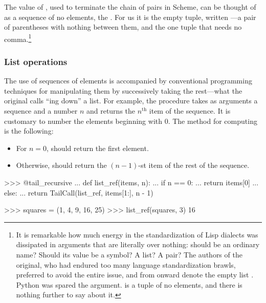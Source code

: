 The value of , used to terminate the chain of pairs in Scheme, can be
thought
of as a sequence of no elements, the .  For us it is the
empty tuple, written \code{()}---a pair of parentheses with nothing between
them, and the one tuple that needs no comma.\footnote{It is remarkable how much
energy in the standardization of Lisp dialects was dissipated in arguments that
are literally over nothing: should  be an ordinary name?  Should its
value be a symbol?  A list?  A pair?  The authors of the original, who had
endured too many language standardization brawls, preferred to avoid the entire
issue, and from  onward denote the empty list .
Python was spared the argument.  \code{()} is a tuple of no elements, and there
is nothing further to say about it.}

\subsubsection*{List operations}

The use of sequences of elements is accompanied by conventional programming
techniques for manipulating them by successively taking the rest---what the
original calls ``ing down'' a list.  For example, the procedure
 takes as arguments a sequence and a number \( n \) and returns
the \( n^{\mathrm{th}} \) item of the sequence.  It is customary to number the
elements beginning with 0.  The method for computing  is the
following:

\begin{itemize}
\item
For \( n = 0 \),  should return the first element.

\item
Otherwise,  should return the \( (n - 1) \)-st item of the rest
of the sequence.
\end{itemize}

\begin{codeBlock}
>>> @tail_recursive
... def list_ref(items, n):
...     if n == 0:
...         return items[0]
...     else:
...         return TailCall(list_ref, items[1:], n - 1)

>>> squares = (1, 4, 9, 16, 25)
>>> list_ref(squares, 3)
16
\end{codeBlock}

